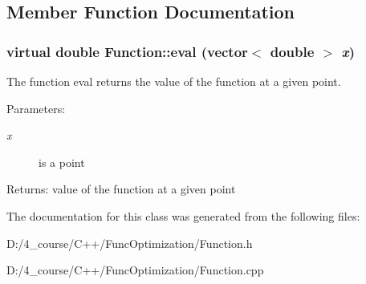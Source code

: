 \subsection{Member Function Documentation}
\hypertarget{class_function_3bf8e78d5e96e6772b9ebd3c81cbb50f}{
\subsubsection[{eval}]{\setlength{\rightskip}{0pt plus 5cm}virtual double Function::eval (vector$<$ double $>$ {\em x})}}
\label{class_function_3bf8e78d5e96e6772b9ebd3c81cbb50f}


The function eval returns the value of the function at a given point.

\begin{Desc}
\item[Parameters:]
\begin{description}
\item[{\em x}]is a point \end{description}
\end{Desc}
\begin{Desc}
\item[Returns:]value of the function at a given point \end{Desc}


The documentation for this class was generated from the following files:\begin{CompactItemize}
\item 
D:/4\_\-course/C++/FuncOptimization/Function.h\item 
D:/4\_\-course/C++/FuncOptimization/Function.cpp\end{CompactItemize}

